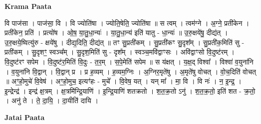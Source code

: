 \documentclass[17pt]{extarticle}
\begin{document}
\textbf{Krama Paata} \newline

वि पाज॑सा । पाज॑सा॒ वि । वि ज्योति॑षा । ज्योति॒षेति॒ ज्योति॑षा ॥ स त्वम् । त्वम॑ग्ने । अ॒ग्ने॒ प्रती॑केन । प्रती॑केन॒ प्रति॑ । प्रत्यो॑ष । ओ॒ष॒ या॒तु॒धा॒न्यः॑ । या॒तु॒धा॒न्य॑ इति॑ यातु - धा॒न्यः॑ ॥ उ॒रु॒क्षये॑षु॒ दीद्य॑त् । उ॒रु॒क्षये॒ष्वित्यु॑रु - क्षये॑षु । दीद्य॒दिति॒ दीद्य॑त् ॥ तꣳ सु॒प्रती॑कम् । सु॒प्रती॑कꣳ सु॒दृश᳚म् । सु॒प्रती॑क॒मिति॑ सु - प्रती॑कम् । सु॒दृशꣳ॒॒ स्वञ्च᳚म् । सु॒दृश॒मिति॑ सु - दृश᳚म् । स्वञ्च॒मवि॑द्वाꣳसः । अवि॑द्वाꣳसो वि॒दुष्ट॑रम् । वि॒दुष्ट॑रꣳ सपेम । वि॒दुष्ट॑र॒मिति॑ वि॒दुः - त॒र॒म् । स॒पे॒मेति॑ सपेम ॥ स य॑क्षत् । य॒क्ष॒द् विश्वा᳚ । विश्वा॑ व॒युना॑नि । व॒युना॑नि वि॒द्वान् । वि॒द्वान् प्र । प्र ह॒व्यम् । ह॒व्यम॒ग्निः । अ॒ग्निर॒मृते॑षु । अ॒मृते॑षु वोचत् । वो॒च॒दिति॑ वोचत् ॥ अꣳ॒॒हो॒मुचे॑ वि॒वेष॑ । अꣳ॒॒हो॒मुच॒ इत्यꣳ॑हः - मुचे᳚ । वि॒वेष॒ यत् । यन् मा᳚ । मा॒ वि । वि नः॑ । न॒ इ॒न्द्र॒ । इ॒न्द्रेन्द्र॑ । इन्द्र॑ क्ष॒त्रम् । क्ष॒त्रमि॑न्द्रि॒याणि॑ । इ॒न्द्रि॒याणि॑ शतक्रतो । श॒त॒क्र॒तो ऽनु॑ । श॒त॒क्र॒तो॒ इति॑ शत - क्र॒तो॒ । अनु॑ ते । ते॒ दा॒यि॒ । दा॒यीति॑ दायि । \newline

\textbf{Jatai Paata} \newline
\end{document}
